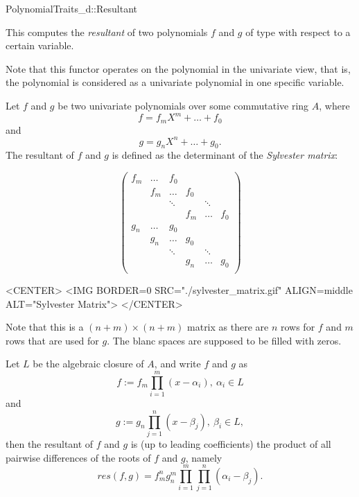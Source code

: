 \begin{ccRefConcept}{PolynomialTraits_d::Resultant}
\ccDefinition

This  computes the {\em resultant} of two polynomials 
$f$ and $g$ of type  with respect to a 
certain variable.
 
Note that this functor operates on the polynomial in the univariate view, 
that is, the polynomial is considered as a univariate polynomial in one 
specific variable. 

Let $f$ and $g$ be two univariate polynomials over some commutative ring $A$, 
where 
\[f = f_mX^m + \dots + f_0\] and 
\[g = g_nX^n + \dots + g_0.\] 
The resultant of $f$ and $g$ is defined as the determinant of the {\em Sylvester matrix}: 

\begin{ccTexOnly}
\[ \left( \begin{array}{cccccccc}
f_m & \dots & f_0&&& \\
&f_m & \dots & f_0&&\\
&&\ddots&&\ddots&\\
&&&f_m &\dots& f_0\\  
g_n & \dots & g_0&&& \\
&g_n & \dots & g_0&&\\
&&\ddots&&\ddots&\\
&&&g_n & \dots& g_0\\  
\end{array} \right) \]
\end{ccTexOnly}

\begin{ccHtmlOnly}
<CENTER>
<IMG BORDER=0 SRC="./sylvester_matrix.gif" ALIGN=middle ALT="Sylvester Matrix">
</CENTER>
\end{ccHtmlOnly}

Note that this is a $(n+m)\times(n+m)$ matrix as there are $n$ rows for $f$ 
and $m$ rows that are used for $g$. The blanc spaces are supposed to be 
filled with zeros. 


\begin{ccAdvanced}
Let $L$ be the algebraic closure of $A$, and write $f$ and $g$ as 
\[f := f_m \prod_{i=1}^{m}{(x-\alpha_i)},\ \alpha_i \in L \]
and 
\[g :=  g_n \prod_{j=1}^{n}{(x-\beta_j)},\ \beta_i \in L,\] then
the resultant of $f$ and $g$ is (up to leading coefficients) 
the product of all pairwise differences of the roots of $f$ and $g$, namely 
\[res(f,g) = f_m^n g_n^m \prod_{i=1}^{m}\prod_{j=1}^{n}{(\alpha_i-\beta_j)}.\] 
\end{ccAdvanced}


\end{ccRefConcept}
